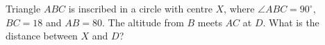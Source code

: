 Triangle $ABC$ is inscribed in a circle with centre $X$, where $\angle ABC=90^\circ$, $BC=18$ and $AB=80$. The altitude from $B$ meets $AC$ at $D$. What is the distance between $X$ and $D$?
